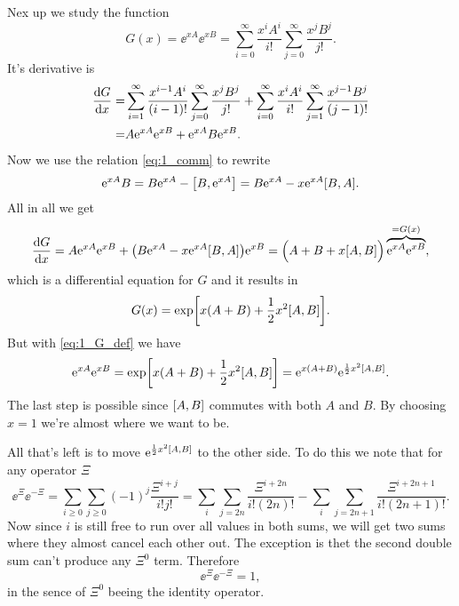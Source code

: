 \documentclass[11pt,letter, swedish, english
]{article}
\begin{document}
Nex up we study the function
\begin{equation}\label{eq:1_G_def}
G(x)=\ee^{xA}\ee^{xB}
=\sum_{i=0}^\infty\frac{x^iA^i}{i!}\sum_{j=0}^\infty\frac{x^jB^j}{j!}.
\end{equation}
It's derivative is
\begin{equation}
\begin{aligned}
\dv{G}{x}=&
\sum_{i=1}^\infty\frac{x^{i-1}A^i}{(i-1)!}\sum_{j=0}^\infty\frac{x^jB^j}{j!}
+\sum_{i=0}^\infty\frac{x^iA^i}{i!}\sum_{j=1}^\infty\frac{x^{j-1}B^j}{(j-1)!}\\
=&A\mathrm{e}^{xA}\mathrm{e}^{xB} + \mathrm{e}^{xA}B\mathrm{e}^{xB}.
\end{aligned}
\end{equation}
Now we use the relation \eqref{eq:1_comm} to rewrite
\begin{equation}
\ee^{xA}B = B\ee^{xA}-\comm{B}{\ee^{xA}}
=B\ee^{xA}-x\ee^{xA}\comm{B}{A}.
\end{equation}
All in all we get
\vspace{-4mm}
\begin{equation}
\dv{G}{x}=A\ee^{xA}\ee^{xB}+\qty(B\ee^{xA}-x\ee^{xA}\comm{B}{A})\ee^{xB}
=\Big(A+B+x\comm{A}{B}\Big)\overbrace{\ee^{xA}\ee^{xB}}^{=G(x)},
\end{equation}
which is a differential equation for $G$ and it results in
\begin{equation}
G(x)=\exp[x(A+B)+\frac{1}{2}x^2\comm{A}{B}].
\end{equation}
But with \eqref{eq:1_G_def} we have
\begin{equation}\label{eq:1_almost}
\ee^{xA}\ee^{xB}=\exp[x(A+B)+\frac{1}{2}x^2\comm{A}{B}]
=\ee^{x(A+B)}\ee^{\frac{1}{2}x^2\comm{A}{B}}.
\end{equation}
The last step is possible since $\comm{A}{B}$ commutes with both $A$
and $B$. By choosing $x=1$ we're almost where we want to be. 

All that's left is to move $\ee^{\frac{1}{2}x^2\comm{A}{B}}$ to the
other side. To do this we note that for any operator $\Xi$
\begin{equation}
\ee^{\Xi}\ee^{-\Xi}=\sum_{i\ge0}\sum_{j\ge0}(-1)^j\frac{\Xi^{i+j}}{i!j!}
=\sum_i\sum_{j=2n}\frac{\Xi^{i+2n}}{i!(2n)!}
-\sum_i\sum_{j=2n+1}\frac{\Xi^{i+2n+1}}{i!(2n+1)!}.
\end{equation}
Now since $i$ is still free to run over all values in both sums, we
will get two sums where they almost cancel each other out. The
exception is thet the second double sum can't produce any $\Xi^0$
term. Therefore
\begin{equation}
\ee^{\Xi}\ee^{-\Xi}=1,
\end{equation}
in the sence of $\Xi^0$ beeing the identity operator. 
\end{document}
